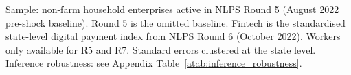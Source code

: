 \par \raggedright 
Sample: non-farm household enterprises active in NLPS Round 5 (August 2022 pre-shock baseline). Round 5 is the omitted baseline. Fintech is the standardised state-level digital payment index from NLPS Round 6 (October 2022). Workers only available for R5 and R7. Standard errors clustered at the state level. Inference robustness: see Appendix Table~\ref{atab:inference_robustness}.
\par\endgroup


